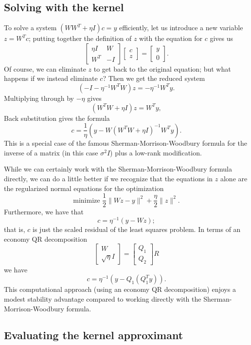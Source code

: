 \documentclass[12pt, leqno]{article} %
\begin{document}
\subsection{Solving with the kernel}

To solve a system $(WW^T + \eta I) c = y$ efficiently,
let us introduce a new variable $z = W^T c$; putting together the
definition of $z$ with the equation for $c$ gives us
\[
  \begin{bmatrix} \eta I & W \\ W^T & -I \end{bmatrix}
  \begin{bmatrix} c \\ z \end{bmatrix} =
  \begin{bmatrix} y \\ 0 \end{bmatrix}.
\]
Of course, we can eliminate $z$ to get back to the original
equation; but what happens if we instead eliminate $c$?  Then we
get the reduced system
\[
  (-I-\eta^{-1} W^T W) z = -\eta^{-1} W^T y.
\]
Multiplying through by $-\eta$ gives
\[
  (W^T W + \eta I) z = W^T y,
\]
Back substitution gives the formula
\[
  c = \frac{1}{\eta} \left( y - W (W^T W + \eta I)^{-1} W^T y \right).
\]
This is a special case of the famous Sherman-Morrison-Woodbury formula
for the inverse of a matrix (in this case $\sigma^2 I$) plus a
low-rank modification.

While we can certainly work with the Sherman-Morrison-Woodbury formula
directly, we can do a little better if we recognize that the equations in
$z$ alone are the regularized normal equations for the optimization
\[
  \mbox{minimize } \frac{1}{2} \|W z - y\|^2 + \frac{\eta}{2} \|z\|^2.
\]
Furthermore, we have that
\[
  c = \eta^{-1} (y - W z);
\]
that is, $c$ is just the scaled residual of the least squares problem.
In terms of an economy QR decomposition
\[
  \begin{bmatrix} W \\ \sqrt{\eta} I \end{bmatrix} =
  \begin{bmatrix} Q_1 \\ Q_2 \end{bmatrix} R
\]
we have
\[
  c = \eta^{-1}\left( y - Q_1 (Q_1^T y) \right).
\]
This computational approach (using an economy QR decomposition) enjoys
a modest stability advantage compared to working directly with the
Sherman-Morrison-Woodbury formula.

\subsection{Evaluating the kernel approximant}
\end{document}
